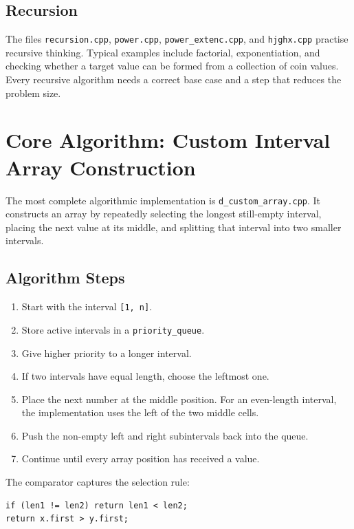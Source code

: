 \documentclass[12pt,a4paper]{article}
\begin{document}
\subsection{Recursion}

The files \texttt{recursion.cpp}, \texttt{power.cpp}, \texttt{power\_extenc.cpp},
and \texttt{hjghx.cpp} practise recursive thinking. Typical examples include
factorial, exponentiation, and checking whether a target value can be formed
from a collection of coin values. Every recursive algorithm needs a correct
base case and a step that reduces the problem size.

\section{Core Algorithm: Custom Interval Array Construction}

The most complete algorithmic implementation is \texttt{d\_custom\_array.cpp}.
It constructs an array by repeatedly selecting the longest still-empty interval,
placing the next value at its middle, and splitting that interval into two
smaller intervals.

\subsection{Algorithm Steps}

\begin{enumerate}
    \item Start with the interval \texttt{[1, n]}.
    \item Store active intervals in a \texttt{priority\_queue}.
    \item Give higher priority to a longer interval.
    \item If two intervals have equal length, choose the leftmost one.
    \item Place the next number at the middle position. For an even-length
          interval, the implementation uses the left of the two middle cells.
    \item Push the non-empty left and right subintervals back into the queue.
    \item Continue until every array position has received a value.
\end{enumerate}

The comparator captures the selection rule:

\begin{verbatim}
if (len1 != len2) return len1 < len2;
return x.first > y.first;
\end{verbatim}
\end{document}
